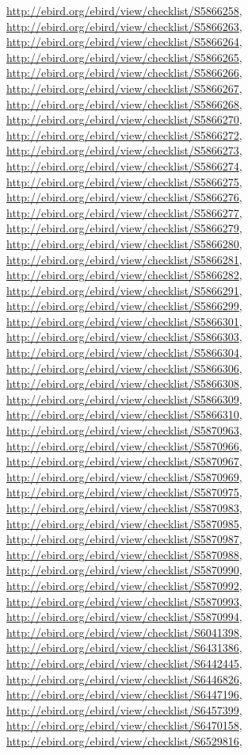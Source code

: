 \documentclass[9pt, article]{memoir}
\begin{document}
\begin{multicols}{2}
\url{http://ebird.org/ebird/view/checklist/S5866258}, 
\url{http://ebird.org/ebird/view/checklist/S5866263}, 
\url{http://ebird.org/ebird/view/checklist/S5866264}, 
\url{http://ebird.org/ebird/view/checklist/S5866265}, 
\url{http://ebird.org/ebird/view/checklist/S5866266}, 
\url{http://ebird.org/ebird/view/checklist/S5866267}, 
\url{http://ebird.org/ebird/view/checklist/S5866268}, 
\url{http://ebird.org/ebird/view/checklist/S5866270}, 
\url{http://ebird.org/ebird/view/checklist/S5866272}, 
\url{http://ebird.org/ebird/view/checklist/S5866273}, 
\url{http://ebird.org/ebird/view/checklist/S5866274}, 
\url{http://ebird.org/ebird/view/checklist/S5866275}, 
\url{http://ebird.org/ebird/view/checklist/S5866276}, 
\url{http://ebird.org/ebird/view/checklist/S5866277}, 
\url{http://ebird.org/ebird/view/checklist/S5866279}, 
\url{http://ebird.org/ebird/view/checklist/S5866280}, 
\url{http://ebird.org/ebird/view/checklist/S5866281}, 
\url{http://ebird.org/ebird/view/checklist/S5866282}, 
\url{http://ebird.org/ebird/view/checklist/S5866291}, 
\url{http://ebird.org/ebird/view/checklist/S5866299}, 
\url{http://ebird.org/ebird/view/checklist/S5866301}, 
\url{http://ebird.org/ebird/view/checklist/S5866303}, 
\url{http://ebird.org/ebird/view/checklist/S5866304}, 
\url{http://ebird.org/ebird/view/checklist/S5866306}, 
\url{http://ebird.org/ebird/view/checklist/S5866308}, 
\url{http://ebird.org/ebird/view/checklist/S5866309}, 
\url{http://ebird.org/ebird/view/checklist/S5866310}, 
\url{http://ebird.org/ebird/view/checklist/S5870963}, 
\url{http://ebird.org/ebird/view/checklist/S5870966}, 
\url{http://ebird.org/ebird/view/checklist/S5870967}, 
\url{http://ebird.org/ebird/view/checklist/S5870969}, 
\url{http://ebird.org/ebird/view/checklist/S5870975}, 
\url{http://ebird.org/ebird/view/checklist/S5870983}, 
\url{http://ebird.org/ebird/view/checklist/S5870985}, 
\url{http://ebird.org/ebird/view/checklist/S5870987}, 
\url{http://ebird.org/ebird/view/checklist/S5870988}, 
\url{http://ebird.org/ebird/view/checklist/S5870990}, 
\url{http://ebird.org/ebird/view/checklist/S5870992}, 
\url{http://ebird.org/ebird/view/checklist/S5870993}, 
\url{http://ebird.org/ebird/view/checklist/S5870994}, 
\url{http://ebird.org/ebird/view/checklist/S6041398}, 
\url{http://ebird.org/ebird/view/checklist/S6431386}, 
\url{http://ebird.org/ebird/view/checklist/S6442445}, 
\url{http://ebird.org/ebird/view/checklist/S6446826}, 
\url{http://ebird.org/ebird/view/checklist/S6447196}, 
\url{http://ebird.org/ebird/view/checklist/S6457399}, 
\url{http://ebird.org/ebird/view/checklist/S6470158}, 
\url{http://ebird.org/ebird/view/checklist/S6529816}, 

\end{multicols}
\end{document}
